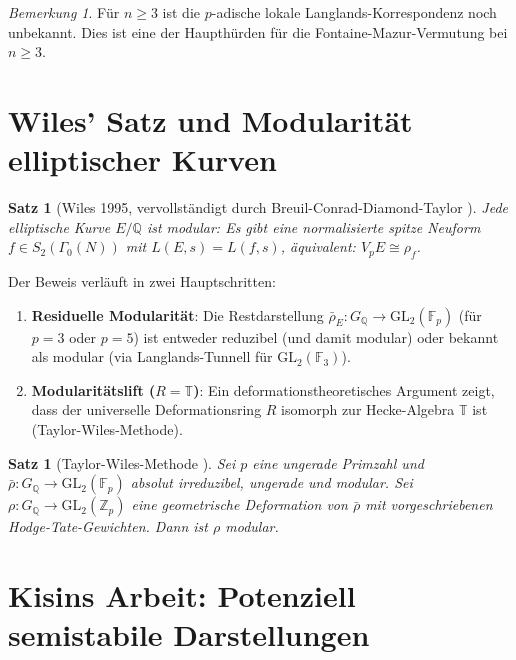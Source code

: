 \documentclass[12pt,a4paper]{amsart}
\newtheorem{satz}[theorem]{Satz}
\theoremstyle{definition}
\theoremstyle{remark}
\newtheorem{bemerkung}[theorem]{Bemerkung}
\newcommand{\GL}{\mathrm{GL}}
\newcommand{\Zp}{\mathbb{Z}_p}
\newcommand{\GQ}{G_{\mathbb{Q}}}
\newcommand{\Q}{\mathbb{Q}}
\newcommand{\F}{\mathbb{F}}
\begin{document}
\begin{bemerkung}
  Für $n \geq 3$ ist die $p$-adische lokale Langlands-Korrespondenz noch unbekannt.
  Dies ist eine der Haupthürden für die Fontaine-Mazur-Vermutung bei $n \geq 3$.
\end{bemerkung}

\section{Wiles' Satz und Modularität elliptischer Kurven}\label{sec:wiles}

\begin{satz}[Wiles 1995, vervollständigt durch Breuil-Conrad-Diamond-Taylor
  \cite{BCDT2001}]
  Jede elliptische Kurve $E/\Q$ ist modular: Es gibt eine normalisierte spitze Neuform
  $f \in S_2(\Gamma_0(N))$ mit $L(E,s) = L(f,s)$, äquivalent: $V_p E \cong \rho_f$.
\end{satz}

Der Beweis verläuft in zwei Hauptschritten:
\begin{enumerate}[label=(\roman*)]
  \item \textbf{Residuelle Modularität}: Die Restdarstellung
    $\bar{\rho}_E \colon \GQ \to \GL_2(\F_p)$ (für $p=3$ oder $p=5$) ist entweder
    reduzibel (und damit modular) oder bekannt als modular (via Langlands-Tunnell für
    $\GL_2(\F_3)$).
  \item \textbf{Modularitätslift ($R = \mathbb{T}$)}: Ein deformationstheoretisches
    Argument zeigt, dass der universelle Deformationsring $R$ isomorph zur Hecke-Algebra
    $\mathbb{T}$ ist (Taylor-Wiles-Methode).
\end{enumerate}

\begin{satz}[Taylor-Wiles-Methode \cite{TW1995}]
  Sei $p$ eine ungerade Primzahl und $\bar{\rho}\colon \GQ \to \GL_2(\F_p)$ absolut
  irreduzibel, ungerade und modular. Sei $\rho\colon \GQ \to \GL_2(\Zp)$ eine
  geometrische Deformation von $\bar{\rho}$ mit vorgeschriebenen Hodge-Tate-Gewichten.
  Dann ist $\rho$ modular.
\end{satz}

\section{Kisins Arbeit: Potenziell semistabile Darstellungen}\label{sec:kisin}
\end{document}

